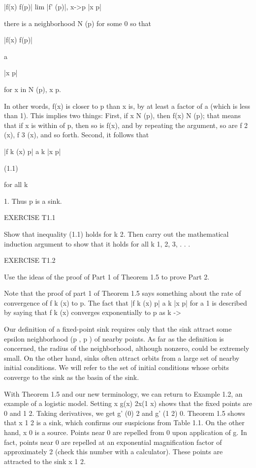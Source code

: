 \documentclass[12pt]{article}
\begin{document}
|f(x)  f(p)| lim  |f' (p)|, x->p |x  p|

there is a neighborhood N  (p) for some  
 0 so that

|f(x)  f(p)|

 a

|x  p|

for x in N  (p), x p.

In other words, f(x) is closer to p than x is, by at least a factor of a (which is less than 1). This 
implies two things: First, if x  N  (p), then f(x)  N  (p); that means that if x is within  of p, then so 
is f(x), and by repeating the argument, so are f 2 (x), f 3 (x), and so forth. Second, it follows that

|f k (x)  p| a k |x  p|

(1.1)

for all k


 1. Thus p is a sink.

 

EXERCISE T1.1

Show that inequality (1.1) holds for k  2. Then carry out the mathematical induction argument to show that 
it holds for all k  1, 2, 3, . . .

EXERCISE T1.2

Use the ideas of the proof of Part 1 of Theorem 1.5 to prove Part 2.

Note that the proof of part 1 of Theorem 1.5 says something about the rate of convergence of f k (x) to p. 
The fact that |f k (x)  p| a k |x  p| for a  1 is described by saying that f k (x) converges exponentially 
to p as k -> 


Our definition of a fixed-point sink requires only that the sink attract some epsilon neighborhood (p  , p  
) of nearby points. As far as the definition is concerned, the radius  of the neighborhood, although 
nonzero, could be extremely small. On the other hand, sinks often attract orbits from a large set of nearby 
initial conditions. We will refer to the set of initial conditions whose orbits converge to the sink as the 
basin of the sink.

With Theorem 1.5 and our new terminology, we can return to Example 1.2, an example of a logistic model. 
Setting x  g(x)  2x(1  x) shows that the fixed points are 0 and 1  2. Taking derivatives, we get g' (0)  2 
and g' (1  2)  0. Theorem 1.5 shows that x  1  2 is a sink, which confirms our suspicions from Table 1.1. 
On the other hand, x  0 is a source. Points near 0 are repelled from 0 upon application of g. In fact, 
points near 0 are repelled at an exponential magnification factor of approximately 2 (check this number 
with a calculator). These points are attracted to the sink x  1  2.
\end{document}
